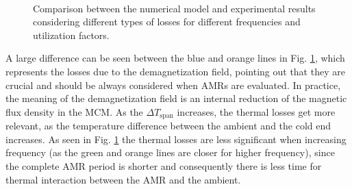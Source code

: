 \documentclass[review,preprint,12pt]{elsarticle}
\begin{document}
\begin{figure}[htp]
\\

\caption{Comparison between the numerical model and \cite{Trevizoli2015} experimental results considering different types of losses for different frequencies and utilization factors.} 
\label{fig:results_losses}
\end{figure}

A large difference can be seen between the blue and orange lines in Fig. \ref{fig:results_losses}, which represents the losses due to the demagnetization field, pointing out that they are crucial and should be always considered when AMRs are evaluated. In practice, the meaning of the demagnetization field is an internal reduction of the magnetic flux density in the MCM. As the $\Delta T_\textrm{span}$ increases, the thermal losses get more relevant, as the temperature difference between the ambient and the cold end increases. As seen in Fig. \ref{fig:results_losses} the thermal losses are less significant when increasing frequency (as the green and orange lines are closer for higher frequency), since the complete AMR period is shorter and consequently there is less time for thermal interaction between the AMR and the ambient. 
\end{document}
